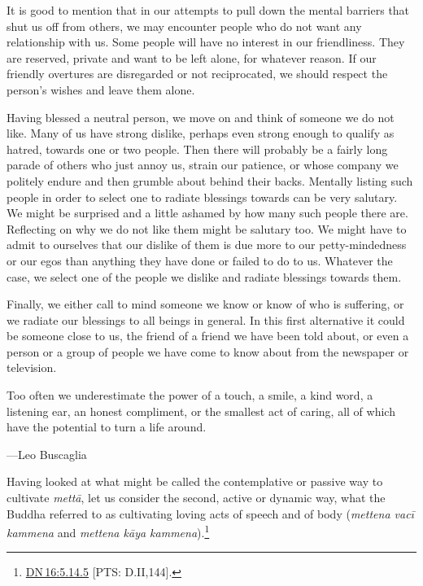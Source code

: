 \documentclass[10pt, openright]{book}
\newenvironment{epigram-2}%
{%
\vspace{1em}
\noindent
\quoting[leftmargin=2.5cm,rightmargin=2.5cm]%
\begin{itshape}
\large
}%
{\end{itshape}\endquoting
}%
\newenvironment{epigram-2-cite}%
{%
\quoting[leftmargin=2.5cm,rightmargin=2.5cm]%
\noindent\normal\hspace*{\fill} 
}%
{\endquoting\vspace{1em}
}%
\begin{document}
It is good to mention that in our attempts to pull down the mental barriers that shut us off from others, we may encounter people who do not want any relationship with us. Some people will have no interest in our friendliness. They are reserved, private and want to be left alone, for whatever reason. If our friendly overtures are disregarded or not reciprocated, we should respect the person’s wishes and leave them alone.


Having blessed a neutral person, we move on and think of someone we do not like. Many of us have strong dislike, perhaps even strong enough to qualify as hatred, towards one or two people. Then there will probably be a fairly long parade of others who just annoy us, strain our patience, or whose company we politely endure and then grumble about behind their backs. Mentally listing such people in order to select one to radiate blessings towards can be very salutary. We might be surprised and a little ashamed by how many such people there are. Reflecting on why we do not like them might be salutary too. We might have to admit to ourselves that our dislike of them is due more to our petty-mindedness or our egos than anything they have done or failed to do to us. Whatever the case, we select one of the people we dislike and radiate blessings towards them.


Finally, we either call to mind someone we know or know of who is suffering, or we radiate our blessings to all beings in general. In this first alternative it could be someone close to us, the friend of a friend we have been told about, or even a person or a group of people we have come to know about from the newspaper or television.


\begin{epigram-2}
Too often we underestimate the power of a touch, a smile, a kind word, a listening ear, an honest compliment, or the smallest act of caring, all of which have the potential to turn a life around.
\end{epigram-2}

\begin{epigram-2-cite}
—Leo Buscaglia
\end{epigram-2-cite}

Having looked at what might be called the contemplative or passive way to cultivate \textit{mettā}, let us consider the second, active or dynamic way, what the Buddha referred to as cultivating loving acts of speech and of body (\textit{mettena vacī kammena} and \textit{mettena kāya kammena}).\footnote {\href{https://suttacentral.net/dn16/en/sujato\#5.14.5}{DN 16:5.14.5} [PTS: D.II,144].}
\end{document}
